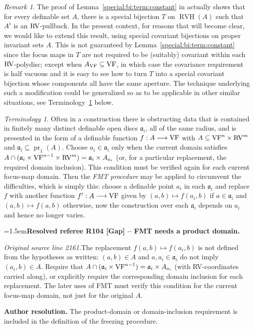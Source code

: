 \documentclass[12pt]{amsart}
\newcommand{\ResolvedRefereeRemark}[5]{%
  \par\medskip\begingroup\normalfont\small\color{gray}%
  \emergencystretch=1.5em\noindent\textbf{Resolved referee R#1 [#2] -- #3.}\par\nobreak\noindent #4\par
  \medskip\color{ResolutionGreen}\noindent\textbf{Author resolution.} #5\par
  \endgroup\medskip
}
\newcommand{\memph}[1]{{\color{magenta}\emph{#1}}}
\theoremstyle{plain}
\theoremstyle{definition}
\theoremstyle{remark}
\newtheorem{rem}[thm]{Remark}
\newtheorem{ter}[thm]{Terminology}
\numberwithin{equation}{section}
\theoremstyle{plain}
\newcommand{\VF}{\textup{VF}}
\newcommand{\RV}{\textup{RV}}
\DeclareMathOperator{\pr}{pr}
\newcommand{\ga}{\mathfrak{a}}
\newcommand{\0}{\emptyset}
\newcommand{\fun}{\longrightarrow}
\newcommand{\efun}{\longmapsto}
\newcommand{\sub}{\subseteq}
\DeclareMathOperator{\RVH}{RVH}
\begin{document}
\begin{rem}\label{special:pseudo}
The proof of Lemma~\ref{special:bi:term:constant} in \cite{Yin:special:trans} actually shows that for every definable set $A$, there is a special bijection $T$ on  $\RVH(A)$  such that $A^{\flat}$ is an $\RV$-pullback. In the present context, for reasons that will become clear, we would like to extend this result, using special covariant bijections  on proper invariant sets $A$. This is not guaranteed by Lemma~\ref{special:bi:term:constant} since the focus maps in $T$ are not required to be (suitably) covariant within each $\RV$-polydisc; except when $A_{\VF} \sub \VF$, in which case  the covariance requirement is half vacuous and it is easy to see how to turn $T$ into a special covariant bijection whose components all have the same aperture. The technique underlying such a modification could be generalized so as to be applicable in other similar situations, see  Terminology~\ref{FMT} below.
\end{rem}

\begin{ter}\label{FMT}
Often in a construction there is obstructing data that is contained in finitely many distinct definable open discs $\ga_i$, all of the same radius, and is presented in the form of a definable function $f : A \fun \VF$ with $A\sub\VF^n\times\RV^m$ and $\ga_i\sub\pr_1(A)$. Choose $a_i\in\ga_i$ only when the current domain satisfies $A\cap(\ga_i\times\VF^{n-1}\times\RV^m)=\ga_i\times A_{a_i}$ (or, for a particular replacement, the required domain inclusion). This condition must be verified again for each current focus-map domain. Then the \memph{FMT procedure} may be applied to circumvent the difficulties, which is simply this: choose a definable point $a_i$ in each $\ga_i$ and replace $f$ with another function $f' : A \fun \VF$ given by $(a,b) \efun f(a_i, b)$ if $a \in \ga_i$ and $(a,b) \efun f(a,b)$ otherwise, now the construction over each $\ga_i$ depends on $a_i$ and hence no longer varies.
\end{ter}

\ResolvedRefereeRemark{104}{Gap}{FMT needs a product domain}{%
\textit{Original source line 2161.}\quad The replacement $f(a,b)\mapsto f(a_i,b)$ is not defined from the hypotheses as written: $(a,b)\in A$ and $a,a_i\in\ga_i$ do not imply $(a_i,b)\in A$. Require that $A\cap(\ga_i\times\VF^{n-1})=\ga_i\times A_{a_i}$ (with RV-coordinates carried along), or explicitly require the corresponding domain inclusion for each replacement. The later uses of FMT must verify this condition for the current focus-map domain, not just for the original $A$.
}{The product-domain or domain-inclusion requirement is included in the definition of the freezing procedure.}
\end{document}
